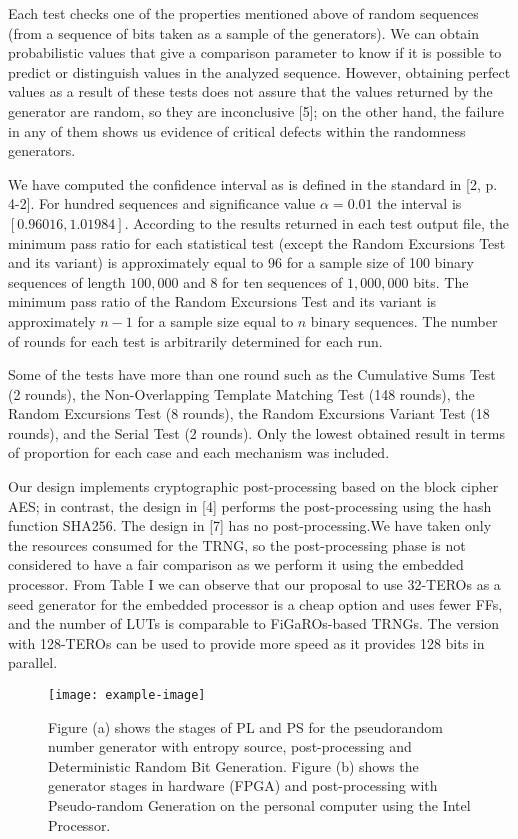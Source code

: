 \documentclass[journal]{IEEEtran}
\begin{document}
Each test checks one of the properties mentioned above of random sequences (from a sequence of bits taken as a sample of the generators). We can obtain probabilistic values that give a comparison parameter to know if it is possible to predict or distinguish values in the analyzed sequence. However, obtaining perfect values as a result of these tests does not assure that the values returned by the generator are random, so they are inconclusive [5]; on the other hand, the failure in any of them shows us evidence of critical defects within the randomness generators.

We have computed the confidence interval as is defined in the standard in [2, p. 4-2]. For hundred sequences and significance value $\alpha = 0.01$ the interval is $[0.96016,1.01984]$. According to the results returned in each test output file, the minimum pass ratio for each statistical test (except the Random Excursions Test and its variant) is approximately equal to 96 for a sample size of 100 binary sequences of length $100,000$ and 8 for ten sequences of $1,000,000$ bits. The minimum pass ratio of the Random Excursions Test and its variant is approximately $n - 1$ for a sample size equal to $n$ binary sequences. The number of rounds for each test is arbitrarily determined for each run.

Some of the tests have more than one round such as the Cumulative Sums Test (2 rounds), the Non-Overlapping Template Matching Test (148 rounds), the Random Excursions Test (8 rounds), the Random Excursions Variant Test (18 rounds), and the Serial Test (2 rounds). Only the lowest obtained result in terms of proportion for each case and each mechanism was included.

Our design implements cryptographic post-processing based on the block cipher AES; in contrast, the design in [4] performs the post-processing using the hash function SHA256. The design in [7] has no post-processing.We have taken only the resources consumed for the TRNG, so the post-processing phase is not considered to have a fair comparison as we perform it using the embedded processor. From Table I we can observe that our proposal to use 32-TEROs as a seed generator for the embedded processor is a cheap option and uses fewer FFs, and the number of LUTs is comparable to FiGaROs-based TRNGs. The version with 128-TEROs can be used to provide more speed as it provides 128 bits in parallel.

\begin{figure*}[ht]
\centering
\texttt{[image: example-image]}
\caption{Figure (a) shows the stages of PL and PS for the pseudorandom number generator with entropy source, post-processing and Deterministic Random Bit Generation. Figure (b) shows the generator stages in hardware (FPGA) and post-processing with Pseudo-random Generation on the personal computer using the Intel Processor.}  
\end{figure*}
\end{document}
